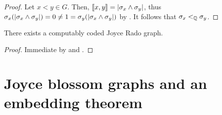 \begin{proof}
Let $x<y\in G$. Then, $\llbracket x , y \rrbracket=|\sigma_x\wedge\sigma_y|$, thus $\sigma_x(|\sigma_x\wedge\sigma_y|)=0\neq 1=\sigma_y(|\sigma_x\wedge\sigma_y|)$ by . It follows that $\sigma_x<_{\mathbb{Q}}\sigma_y$.%

\end{proof}
\begin{corollary}
  There exists a computably coded Joyce Rado graph.
\end{corollary}
\begin{proof}
  Immediate by  and .
\end{proof}

\section{Joyce blossom graphs and an embedding theorem}

